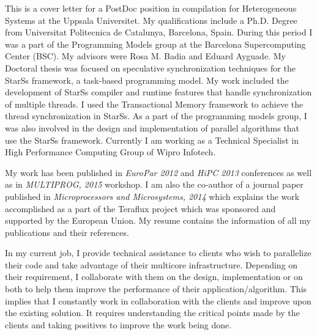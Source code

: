 \documentclass[10pt,stdletter,dateno]{newlfm}
\begin{document}
\begin{newlfm}
	   This is a cover letter for a PostDoc position in compilation for Heterogeneous Systems at the Uppsala Universitet.
	   My qualifications include a Ph.D. Degree from Universitat Politecnica de Catalunya, Barcelona, Spain. 
	   During this period I was a part of the Programming Models group at the Barcelona Supercomputing Center (BSC). 
	   My advisors were Rosa M. Badia and Eduard Ayguade. 
	   My Doctoral thesis was focused on speculative synchronization techniques for the StarSs framework, a task-based programming model.
	   My work included the development of StarSs compiler and runtime features that handle synchronization of multiple threads.
	   I used the Transactional Memory framework to achieve the thread synchronization in StarSs.
	   As a part of the programming models group, I was also involved in the design and implementation of parallel algorithms that use the StarSs framework.
	   Currently I am working as a Technical Specialist in High Performance Computing Group of Wipro Infotech. 
%
	   \par
	   My work has been published in \textit{EuroPar 2012} and \textit{HiPC 2013} conferences as well as in \textit{MULTIPROG, 2015} workshop.  
	   I am also the co-author of a journal paper published in \textit{Microprocessors and Microsystems, 2014} which explains the work accomplished as a part of the Teraflux project which was sponsored and supported by the European Union. 
	   My resume contains the information of all my publications and their references. 
%
	   \par
	   In my current job, I provide technical assistance to clients who wish to parallelize their code and take advantage of their multicore infrastructure. 
	   Depending on their requirement, I collaborate with them on the design, implementation or on both to help them improve the performance of their application/algorithm.
	   This implies that I constantly work in collaboration with the clients and improve upon the existing solution.
	   It requires understanding the critical points made by the clients and taking positives to improve the work being done.


	   
%	   
	   \par
	   



\end{newlfm}
\end{document}

